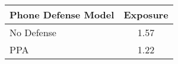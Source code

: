 \begin{table}[ht]

\renewcommand{\arraystretch}{1.5} %
\centering
\begin{tabular}{lc}
\hline
\textbf{Phone Defense Model} & \textbf{Exposure} \\ \hline
No Defense & 1.57 \\ \hline
PPA & 1.22 \\ \hline
\end{tabular}%
\caption{}
\label{tab:exposure_other_user}
\end{table}